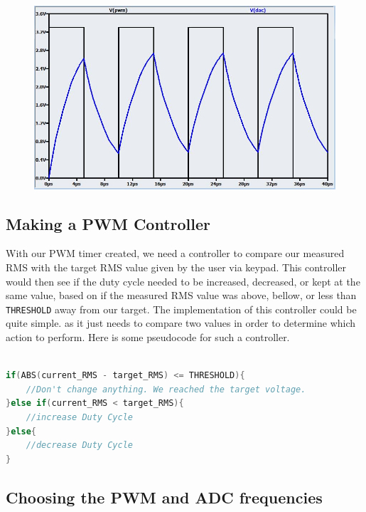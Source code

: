 \begin{figure}[h]
\centering
\includegraphics[scale=0.4]{images/PWMDAC2_plot7.jpg}
%

\end{figure}

\subsection{Making a PWM Controller}

With our PWM timer created, we need a controller to compare our measured RMS with the target RMS value given by the user via keypad. This controller would then see if the duty cycle needed to be increased, decreased, or kept at the same value, based on if the measured RMS value was above, bellow, or less than \verb|THRESHOLD| away from our target. The implementation of this controller could be quite simple. as it just needs to compare two values in order to determine which action to perform. Here is some pseudocode for such a controller.

\begin{lstlisting}[language=C, basicstyle=\small]

if(ABS(current_RMS - target_RMS) <= THRESHOLD){
	//Don't change anything. We reached the target voltage.
}else if(current_RMS < target_RMS){
	//increase Duty Cycle
}else{
	//decrease Duty Cycle
}
\end{lstlisting}

\subsection{Choosing the PWM and ADC frequencies}

